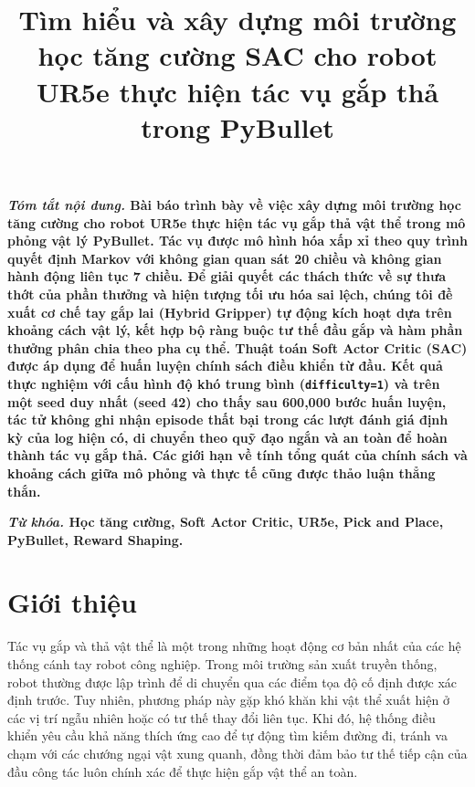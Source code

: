 \documentclass[conference]{IEEEtran}
\makeatletter
\renewcommand{\abstractname}{Tóm tắt nội dung}
\renewcommand{\IEEEkeywordsname}{Từ khóa}
\renewenvironment{abstract}
{\normalfont\@IEEEabskeysecsize\bfseries\textit{\abstractname.}\quad\relax}
{\par\vspace{1.34ex}}
\renewenvironment{IEEEkeywords}
{\normalfont\@IEEEabskeysecsize\bfseries\textit{\IEEEkeywordsname.}\quad\relax}
{\par\vspace{0.67ex}}
\makeatother
\begin{document}
\title{Tìm hiểu và xây dựng môi trường học tăng cường SAC cho robot UR5e thực hiện tác vụ gắp thả trong PyBullet}

\author{
\and
{}
}

\maketitle

\begin{abstract}
Bài báo trình bày về việc xây dựng môi trường học tăng cường cho robot UR5e thực hiện tác vụ gắp thả vật thể trong mô phỏng vật lý PyBullet. Tác vụ được mô hình hóa xấp xỉ theo quy trình quyết định Markov với không gian quan sát 20 chiều và không gian hành động liên tục 7 chiều. Để giải quyết các thách thức về sự thưa thớt của phần thưởng và hiện tượng tối ưu hóa sai lệch, chúng tôi đề xuất cơ chế tay gắp lai (Hybrid Gripper) tự động kích hoạt dựa trên khoảng cách vật lý, kết hợp bộ ràng buộc tư thế đầu gắp và hàm phần thưởng phân chia theo pha cụ thể. Thuật toán Soft Actor Critic (SAC) được áp dụng để huấn luyện chính sách điều khiển từ đầu. Kết quả thực nghiệm với cấu hình độ khó trung bình (\texttt{difficulty=1}) và trên một seed duy nhất (seed 42) cho thấy sau 600,000 bước huấn luyện, tác tử không ghi nhận episode thất bại trong các lượt đánh giá định kỳ của log hiện có, di chuyển theo quỹ đạo ngắn và an toàn để hoàn thành tác vụ gắp thả. Các giới hạn về tính tổng quát của chính sách và khoảng cách giữa mô phỏng và thực tế cũng được thảo luận thẳng thắn.
\end{abstract}

\begin{IEEEkeywords}
Học tăng cường, Soft Actor Critic, UR5e, Pick and Place, PyBullet, Reward Shaping.
\end{IEEEkeywords}

\section{Giới thiệu}
Tác vụ gắp và thả vật thể là một trong những hoạt động cơ bản nhất của các hệ thống cánh tay robot công nghiệp. Trong môi trường sản xuất truyền thống, robot thường được lập trình để di chuyển qua các điểm tọa độ cố định được xác định trước. Tuy nhiên, phương pháp này gặp khó khăn khi vật thể xuất hiện ở các vị trí ngẫu nhiên hoặc có tư thế thay đổi liên tục. Khi đó, hệ thống điều khiển yêu cầu khả năng thích ứng cao để tự động tìm kiếm đường đi, tránh va chạm với các chướng ngại vật xung quanh, đồng thời đảm bảo tư thế tiếp cận của đầu công tác luôn chính xác để thực hiện gắp vật thể an toàn.
\end{document}
